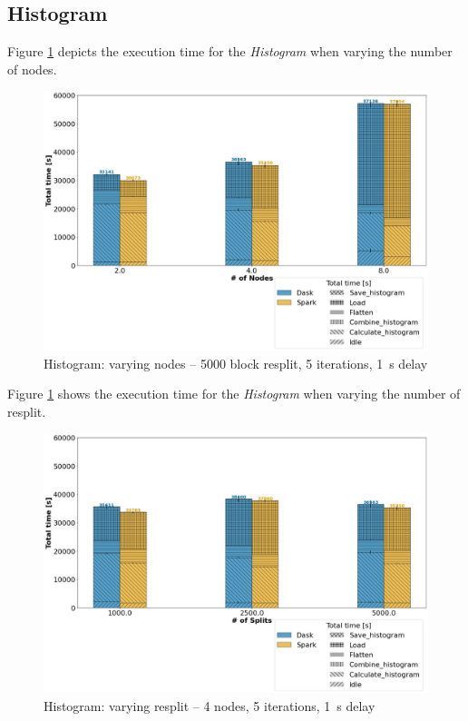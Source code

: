 \documentclass[conference]{IEEEtran}
\begin{document}
\subsection{Histogram}
Figure \ref{fig:histogram_worker} depicts the execution time for the \textit{Histogram} when varying the number of nodes.
\begin{figure}[!h]
	\centering
	\includegraphics[clip,width=\columnwidth]{figures/stacked_histogram_worker.jpg}
	\caption{Histogram: varying nodes -- 5000 block resplit, 5 iterations, \SI{1}{\second} delay}
	\label{fig:histogram_worker}
\end{figure}

Figure \ref{fig:histogram_worker} shows the execution time for the \textit{Histogram} when varying the number of resplit.
\begin{figure}[!h]
	\centering
	\includegraphics[clip,width=\columnwidth]{figures/stacked_histogram_block.jpg}
	\caption{Histogram: varying resplit -- 4 nodes, 5 iterations, \SI{1}{\second} delay}
	\label{fig:histogram_block}
\end{figure}
\end{document}
